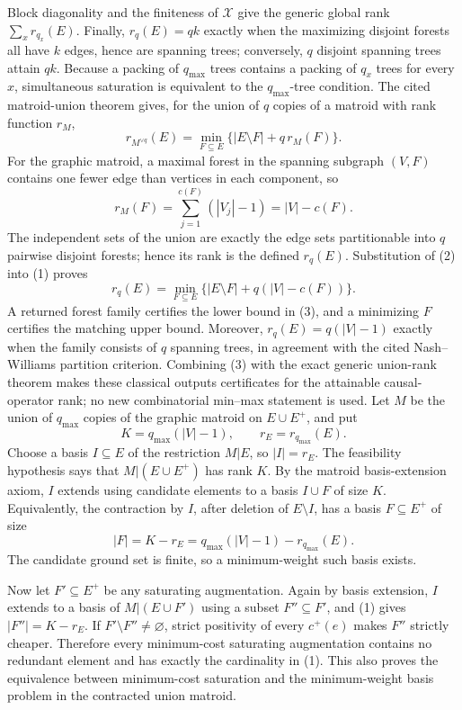 Block diagonality and the finiteness of \(\mathcal X\) give the generic global rank \(\sum_xr_{q_x}(E)\).  Finally, \(r_q(E)=qk\) exactly when the maximizing disjoint forests all have \(k\) edges, hence are spanning trees; conversely, \(q\) disjoint spanning trees attain \(qk\).  Because a packing of \(q_{\max}\) trees contains a packing of \(q_x\) trees for every \(x\), simultaneous saturation is equivalent to the \(q_{\max}\)-tree condition.
The cited matroid-union theorem gives, for the union of \(q\) copies of a matroid with rank function \(r_M\),
\[
r_{M^{\vee q}}(E)=\min_{F\subseteq E}
\{|E\setminus F|+q\,r_M(F)\}.
\tag{1}
\]
For the graphic matroid, a maximal forest in the spanning subgraph \((V,F)\) contains one fewer edge than vertices in each component, so
\[
r_M(F)=\sum_{j=1}^{c(F)}(|V_j|-1)=|V|-c(F).
\tag{2}
\]
The independent sets of the union are exactly the edge sets partitionable into \(q\) pairwise disjoint forests; hence its rank is the defined \(r_q(E)\).  Substitution of (2) into (1) proves
\[
r_q(E)=\min_{F\subseteq E}
\{|E\setminus F|+q(|V|-c(F))\}.
\tag{3}
\]
A returned forest family certifies the lower bound in (3), and a minimizing \(F\) certifies the matching upper bound.  Moreover, \(r_q(E)=q(|V|-1)\) exactly when the family consists of \(q\) spanning trees, in agreement with the cited Nash--Williams partition criterion.  Combining (3) with the exact generic union-rank theorem makes these classical outputs certificates for the attainable causal-operator rank; no new combinatorial min--max statement is used.
Let \(M\) be the union of \(q_{\max}\) copies of the graphic matroid on \(E\cup E^+\), and put
\[
K=q_{\max}(|V|-1),\qquad r_E=r_{q_{\max}}(E).
\]
Choose a basis \(I\subseteq E\) of the restriction \(M|E\), so \(|I|=r_E\).  The feasibility hypothesis says that \(M|(E\cup E^+)\) has rank \(K\).  By the matroid basis-extension axiom, \(I\) extends using candidate elements to a basis \(I\cup F\) of size \(K\).  Equivalently, the contraction by \(I\), after deletion of \(E\setminus I\), has a basis \(F\subseteq E^+\) of size
\[
|F|=K-r_E=q_{\max}(|V|-1)-r_{q_{\max}}(E).
\tag{1}
\]
The candidate ground set is finite, so a minimum-weight such basis exists.

Now let \(F'\subseteq E^+\) be any saturating augmentation.  Again by basis extension, \(I\) extends to a basis of \(M|(E\cup F')\) using a subset \(F''\subseteq F'\), and (1) gives \(|F''|=K-r_E\).  If \(F'\setminus F''\ne\varnothing\), strict positivity of every \(c^+(e)\) makes \(F''\) strictly cheaper.  Therefore every minimum-cost saturating augmentation contains no redundant element and has exactly the cardinality in (1).  This also proves the equivalence between minimum-cost saturation and the minimum-weight basis problem in the contracted union matroid.

